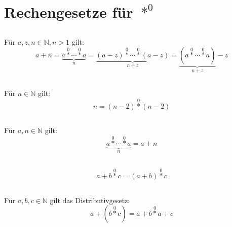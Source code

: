 \documentclass{article}
\begin{document}
\section{Rechengesetze f\"ur $\operatorname*{\ast}^0$\newline}

\subsection{}
F\"ur $a, z, n \in \mathbb{N}, n > 1$ gilt:
\[ a + n = \underbrace{a \operatorname*{\ast}^0 \dotsb \operatorname*{\ast}^0 a}_n =
   \underbrace{\left(a - z\right) \operatorname*{\ast}^0 \dotsb \operatorname*{\ast}^0 \left(a - z\right)}_{n+z} =
   \underbrace{\left(a \operatorname*{\ast}^0 \dotsb \operatorname*{\ast}^0 a\right)}_{n+z} - z \]
\subsection{}
F\"ur $n \in \mathbb{N}$ gilt:
\[ n = \left(n-2\right)\operatorname*{\ast}^{0}\left(n-2\right) \]
\subsection{}
F\"ur $a, n \in \mathbb{N}$ gilt:
\[ \underbrace{a \operatorname*{\ast}^0 \dotsb \operatorname*{\ast}^0 a}_n = a+n \]
\subsection{}
\[ a+b\operatorname*{\ast}^0c = \left(a+b\right)\operatorname*{\ast}^0 c \]
\subsection{}
F\"ur $a, b, c \in \mathbb{N}$ gilt das Distributivgesetz:
\[ a+\left(b\operatorname*{\ast}^0c\right) = a + b \operatorname*{\ast}^0 a + c \]
\end{document}
